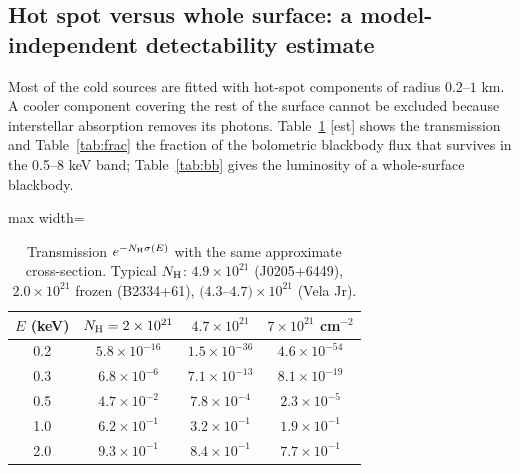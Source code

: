 \documentclass[11pt,a4paper]{article}
\newcommand{\src}[1]{\textsf{[#1]}}
\begin{document}
\subsection{Hot spot versus whole surface: a model-independent detectability estimate}
Most of the cold sources are fitted with hot-spot components of radius $0.2$--$1$ km. A cooler component covering the rest of the surface cannot be excluded because interstellar absorption removes its photons. Table~\ref{tab:trans} \src{est} shows the transmission and Table~\ref{tab:frac} the fraction of the bolometric blackbody flux that survives in the 0.5--8 keV band; Table~\ref{tab:bb} gives the luminosity of a whole-surface blackbody.

\begin{table}[htbp]
\centering\small
\caption{Transmission $e^{-N_{\rm H}\sigma(E)}$ with the same approximate cross-section. Typical $N_{\rm H}$: $4.9\times10^{21}$ (J0205+6449), $2.0\times10^{21}$ frozen (B2334+61), $(4.3$--$4.7)\times10^{21}$ (Vela Jr).}\label{tab:trans}
\begin{adjustbox}{max width=\textwidth}\begin{tabular}{cccc}
\toprule
$E$ (keV) & $N_{\rm H}=2\times10^{21}$ & $4.7\times10^{21}$ & $7\times10^{21}$ cm$^{-2}$\\
\midrule
0.2 & $5.8\times10^{-16}$ & $1.5\times10^{-36}$ & $4.6\times10^{-54}$\\
0.3 & $6.8\times10^{-6}$ & $7.1\times10^{-13}$ & $8.1\times10^{-19}$\\
0.5 & $4.7\times10^{-2}$ & $7.8\times10^{-4}$ & $2.3\times10^{-5}$\\
1.0 & $6.2\times10^{-1}$ & $3.2\times10^{-1}$ & $1.9\times10^{-1}$\\
2.0 & $9.3\times10^{-1}$ & $8.4\times10^{-1}$ & $7.7\times10^{-1}$\\
\bottomrule
\end{tabular}\end{adjustbox}
\end{table}
\end{document}
